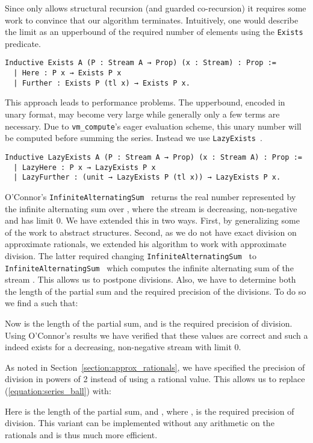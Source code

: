 \documentclass[a4paper,10pt,runningheads]{llncs}
\begin{document}
Since \Coq{} only allows structural recursion (and guarded co-recursion) it requires some work to convince \Coq{} that our algorithm terminates. Intuitively, one would describe the limit as an upperbound of the required number of elements using the \lstinline|Exists| predicate.
\begin{lstlisting}
Inductive Exists A (P : Stream A → Prop) (x : Stream) : Prop :=
  | Here : P x → Exists P x
  | Further : Exists P (tl x) → Exists P x.
\end{lstlisting}
This approach leads to performance problems. The upperbound, encoded in unary format, may become very large while generally only a few terms are necessary. Due to \lstinline|vm_compute|'s eager evaluation scheme, this unary number will be computed before summing the series. Instead we use \lstinline|LazyExists|~\cite{oconnor-thesis}.
\begin{lstlisting}
Inductive LazyExists A (P : Stream A → Prop) (x : Stream A) : Prop :=
  | LazyHere : P x → LazyExists P x
  | LazyFurther : (unit → LazyExists P (tl x)) → LazyExists P x.
\end{lstlisting}

O'Connor's \lstinline|InfiniteAlternatingSum | returns the real number represented by the infinite alternating sum over , where the stream  is decreasing, non-negative and has limit 0.
We have extended this in two ways. First, by generalizing some of the work to abstract structures. Second, as we do not have exact division on approximate rationals, we extended his algorithm to work with approximate division. The latter required changing \lstinline|InfiniteAlternatingSum | to \lstinline|InfiniteAlternatingSum | which computes the infinite alternating sum of the stream . This allows us to postpone divisions. Also, we have to determine both the length of the partial sum and the required precision of the divisions. To do so we find a  such that:

Now  is the length of the partial sum, and  is the required precision of division. Using O'Connor's results we have verified that these values are correct and such a  indeed exists for a decreasing, non-negative stream with limit 0.

As noted in Section~\ref{section:approx_rationals}, we have specified the precision of division in powers of 2 instead of using a rational value. This allows us to replace (\ref{equation:series_ball}) with:

Here  is the length of the partial sum, and , where , is the required precision of division. This variant can be implemented without any arithmetic on the rationals and is thus much more efficient.
\end{document}
